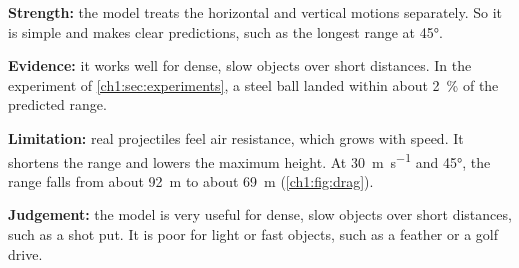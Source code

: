\begin{modelanswer}
 \textbf{Strength:} the model treats the horizontal and vertical motions separately.
So it is simple and makes clear predictions, such as the longest range at \ang{45}.

 \textbf{Evidence:} it works well for dense, slow objects over short distances. In the
experiment of \cref{ch1:sec:experiments}, a steel ball landed within about \qty{2}{\percent}
of the predicted range.

 \textbf{Limitation:} real projectiles feel air resistance, which grows with speed.
It shortens the range and lowers the maximum height. At \qty{30}{m.s^{-1}} and \ang{45}, the
range falls from about \qty{92}{m} to about \qty{69}{m} (\cref{ch1:fig:drag}).

 \textbf{Judgement:} the model is very useful for dense, slow objects over short
distances, such as a shot put. It is poor for light or fast objects, such as a feather or a
golf drive.
\end{modelanswer}

\begin{markingcriteria}
\end{markingcriteria}
